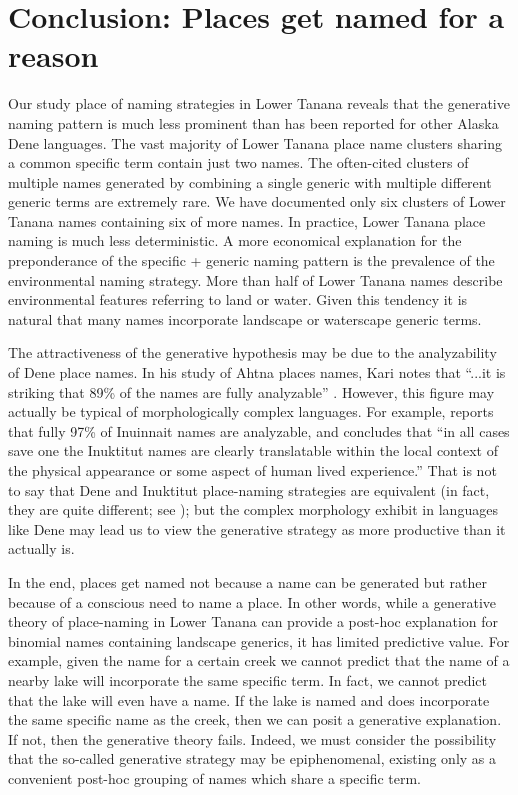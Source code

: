 \section{Conclusion: Places get named for a reason}

Our study place of naming strategies in Lower Tanana reveals that the generative naming pattern is much less prominent than has been reported for other Alaska Dene languages. The vast majority of Lower Tanana place name clusters sharing a common specific term contain just two names. The often-cited clusters of multiple names generated by combining a single generic with multiple different generic terms are extremely rare. We have documented only six clusters of Lower Tanana names containing six of more names. In practice, Lower Tanana place naming is much less deterministic. A more economical explanation for the preponderance of the specific + generic naming pattern is the prevalence of the environmental naming strategy. More than half of Lower Tanana names describe environmental features referring to land or water. Given this tendency it is natural that many names incorporate landscape or waterscape generic terms.

The attractiveness of the generative hypothesis may be due to the analyzability of Dene place names. In his study of Ahtna places names, Kari notes that “...it is striking that 89\% of the names are fully analyzable” \citeyearpar[200]{kari2010}. However, this figure may actually be typical of morphologically complex languages. For example, \citet[103]{collignon2006} reports that fully 97\% of Inuinnait names are analyzable, and  \citet[78]{goehring1990} concludes that “in all cases save one the Inuktitut names are clearly translatable within the local context of the physical appearance or some aspect of human lived experience.” That is not to say that Dene and Inuktitut place-naming strategies are equivalent (in fact, they are quite different; see \citealt{holton2018b}); but the complex morphology exhibit in languages like Dene may lead us to view the generative strategy as more productive than it actually is. 




In the end, places get named not because a name can be generated but rather because of a conscious need to name a place. In other words, while a generative theory of place-naming in Lower Tanana can provide a post-hoc explanation for binomial names containing landscape generics, it has limited predictive value. For example, given the name for a certain creek we cannot predict that the name of a nearby lake will incorporate the same specific term. In fact, we cannot predict that the lake will even have a name. If the lake is named and does incorporate the same specific name as the creek, then we can posit a generative explanation. If not, then the generative theory fails. Indeed, we must consider the possibility that the so-called generative strategy may be epiphenomenal, existing only as a convenient post-hoc grouping of names which share a specific term.

